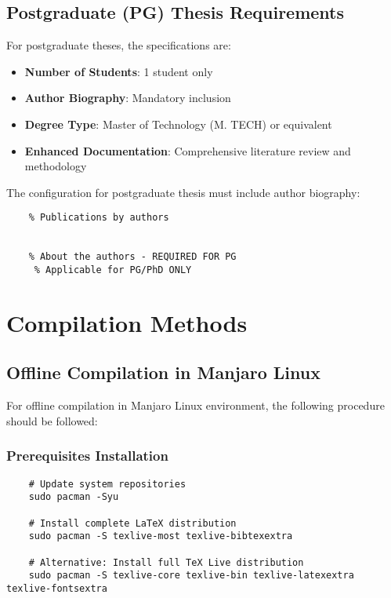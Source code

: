 \subsection{Postgraduate (PG) Thesis Requirements}
\label{subsec:pg_requirements}

For postgraduate theses, the specifications are:

\begin{itemize}
	\item \textbf{Number of Students}: 1 student only
	\item \textbf{Author Biography}: Mandatory inclusion
	\item \textbf{Degree Type}: Master of Technology (M. TECH) or equivalent
	\item \textbf{Enhanced Documentation}: Comprehensive literature review and methodology
\end{itemize}

The configuration for postgraduate thesis must include author biography:

\begin{verbatim}
	% Publications by authors
	
	
	% About the authors - REQUIRED FOR PG
	 % Applicable for PG/PhD ONLY
\end{verbatim}

\section{Compilation Methods}
\label{sec:compilation}

\subsection{Offline Compilation in Manjaro Linux}
\label{subsec:offline_compilation}

For offline compilation in Manjaro Linux environment, the following procedure should be followed:

\subsubsection{Prerequisites Installation}
\label{subsubsec:prerequisites}

\begin{verbatim}
	# Update system repositories
	sudo pacman -Syu
	
	# Install complete LaTeX distribution
	sudo pacman -S texlive-most texlive-bibtexextra
	
	# Alternative: Install full TeX Live distribution
	sudo pacman -S texlive-core texlive-bin texlive-latexextra texlive-fontsextra
\end{verbatim}

